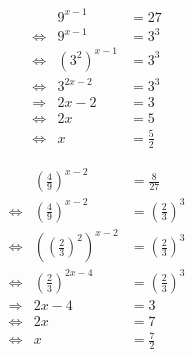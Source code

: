 \begin{uebung}[1]
	\begin{equation*}
		\begin{array}{lrl}
			                & 9^{x-1}       & = 27          \\
			\Leftrightarrow & 9^{x-1}       & = 3^3         \\
			\Leftrightarrow & {(3^2)}^{x-1} & = 3^3         \\
			\Leftrightarrow & 3^{2x-2}      & = 3^3         \\
			\Rightarrow     & 2x-2          & = 3           \\
			\Leftrightarrow & 2x            & = 5           \\
			\Leftrightarrow & x             & = \frac{5}{2}
		\end{array}
	\end{equation*}
\end{uebung}

\begin{uebung}[2]
	\begin{equation*}
		\begin{array}{lrl}
			                & {\left(\frac{4}{9}\right)}^{x-2}                    & = \frac{8}{27} \\
			\Leftrightarrow & {\left(\frac{4}{9}\right)}^{x-2}                    & =
			{\left(\frac{2}{3}\right)}^{3}                                                         \\
			\Leftrightarrow & {\left({\left(\frac{2}{3}\right)}^{2}\right)}^{x-2} & =
			{\left(\frac{2}{3}\right)}^{3}                                                         \\
			\Leftrightarrow & {\left(\frac{2}{3}\right)}^{2x-4}                   & =
			{\left(\frac{2}{3}\right)}^{3}                                                         \\
			\Rightarrow     & 2x-4                                                & = 3            \\
			\Leftrightarrow & 2x                                                  & = 7            \\
			\Leftrightarrow & x                                                   & = \frac{7}{2}
		\end{array}
	\end{equation*}
\end{uebung}

